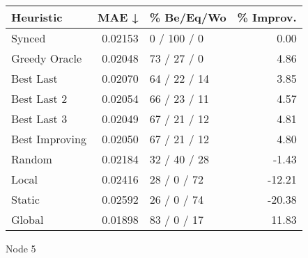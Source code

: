 \begin{tabular}{lrlr}
\toprule
\textbf{Heuristic} & \textbf{MAE ↓} & \textbf{\% Be/Eq/Wo} & \textbf{\% Improv.} \\
\midrule
            Synced &        0.02153 &          0 / 100 / 0 &                0.00 \\
     Greedy Oracle &        0.02048 &          73 / 27 / 0 &                4.86 \\
         Best Last &        0.02070 &         64 / 22 / 14 &                3.85 \\
       Best Last 2 &        0.02054 &         66 / 23 / 11 &                4.57 \\
       Best Last 3 &        0.02049 &         67 / 21 / 12 &                4.81 \\
    Best Improving &        0.02050 &         67 / 21 / 12 &                4.80 \\
            Random &        0.02184 &         32 / 40 / 28 &               -1.43 \\
             Local &        0.02416 &          28 / 0 / 72 &              -12.21 \\
            Static &        0.02592 &          26 / 0 / 74 &              -20.38 \\
            Global &        0.01898 &          83 / 0 / 17 &               11.83 \\
\bottomrule
\end{tabular}
\caption{Node 5}
\label{tab:iid_lr05_le2_bs4_5}
